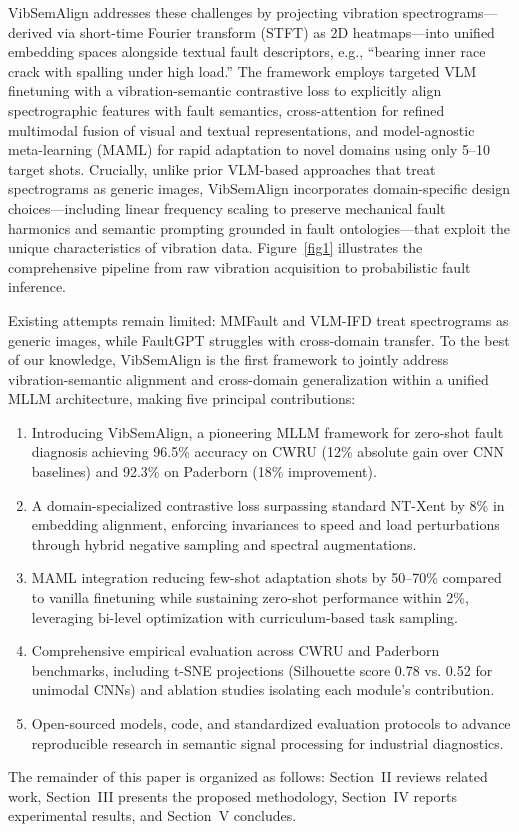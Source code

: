 VibSemAlign addresses these challenges by projecting vibration spectrograms—derived via short-time Fourier transform (STFT) as 2D heatmaps—into unified embedding spaces alongside textual fault descriptors, e.g., ``bearing inner race crack with spalling under high load.'' The framework employs targeted VLM finetuning with a vibration-semantic contrastive loss to explicitly align spectrographic features with fault semantics, cross-attention for refined multimodal fusion of visual and textual representations, and model-agnostic meta-learning (MAML) for rapid adaptation to novel domains using only 5--10 target shots. Crucially, unlike prior VLM-based approaches that treat spectrograms as generic images, VibSemAlign incorporates domain-specific design choices—including linear frequency scaling to preserve mechanical fault harmonics and semantic prompting grounded in fault ontologies—that exploit the unique characteristics of vibration data. Figure~\ref{fig1} illustrates the comprehensive pipeline from raw vibration acquisition to probabilistic fault inference.

Existing attempts remain limited: MMFault \cite{cite23} and VLM-IFD \cite{cite24} treat spectrograms as generic images, while FaultGPT \cite{cite26} struggles with cross-domain transfer. To the best of our knowledge, VibSemAlign is the first framework to jointly address vibration-semantic alignment and cross-domain generalization within a unified MLLM architecture, making five principal contributions:
\begin{enumerate}
\item Introducing VibSemAlign, a pioneering MLLM framework for zero-shot fault diagnosis achieving 96.5\% accuracy on CWRU (12\% absolute gain over CNN baselines) and 92.3\% on Paderborn (18\% improvement).
\item A domain-specialized contrastive loss surpassing standard NT-Xent by 8\% in embedding alignment, enforcing invariances to speed and load perturbations through hybrid negative sampling and spectral augmentations.
\item MAML integration reducing few-shot adaptation shots by 50--70\% compared to vanilla finetuning while sustaining zero-shot performance within 2\%, leveraging bi-level optimization with curriculum-based task sampling.
\item Comprehensive empirical evaluation across CWRU and Paderborn benchmarks, including t-SNE projections (Silhouette score 0.78 vs. 0.52 for unimodal CNNs) and ablation studies isolating each module's contribution.
\item Open-sourced models, code, and standardized evaluation protocols to advance reproducible research in semantic signal processing for industrial diagnostics.
\end{enumerate}

The remainder of this paper is organized as follows: Section~II reviews related work, Section~III presents the proposed methodology, Section~IV reports experimental results, and Section~V concludes.
